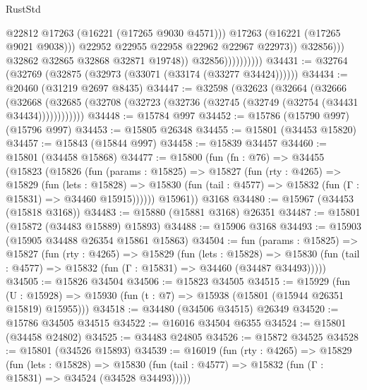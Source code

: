 \begin{lexlean}{RustStd}
\begin{coremodule}
                                          @22812
                                          @17263
                                          (@16221 (@17265 @9030 @4571)))
                                        @17263
                                        (@16221 (@17265 @9021 @9038)))
                                      @22952
                                      @22955
                                      @22958
                                      @22962
                                      @22967
                                      @22973))
                                  @32856)))
                            @32862
                            @32865
                            @32868
                            @32871
                            @19748))
                        @32856))))))))))
@34431 := @32764 (@32769 (@32875 (@32973 (@33071 (@33174 (@33277 @34424))))))
@34434 := @20460 (@31219 @2697 @8435)
@34447 := @32598
    (@32623
      (@32664
        (@32666
          (@32668 (@32685 (@32708 (@32723 (@32736 (@32745 (@32749 (@32754 (@34431 @34434))))))))))))
@34448 := @15784 @997
@34452 := @15786 (@15790 @997) (@15796 @997)
@34453 := @15805 @26348
@34455 := @15801 (@34453 @15820)
@34457 := @15843 (@15844 @997)
@34458 := @15839 @34457
@34460 := @15801 (@34458 @15868)
@34477 := @15800
    (fun (fn : @76) =>
    @34455
      (@15823
        (@15826
          (fun (params : @15825) =>
          @15827
            (fun (rty : @4265) =>
            @15829
              (fun (lets : @15828) =>
              @15830 (fun (tail : @4577) => @15832 (fun (Γ : @15831) => @34460 @15915))))))
        @15961))
    @3168
@34480 := @15967 (@34453 (@15818 @3168))
@34483 := @15880 (@15881 @3168) @26351
@34487 := @15801 (@15872 (@34483 @15889) @15893)
@34488 := @15906 @3168
@34493 := @15903 (@15905 @34488 @26354 @15861 @15863)
@34504 := fun (params : @15825) =>
  @15827
    (fun (rty : @4265) =>
    @15829
      (fun (lets : @15828) =>
      @15830 (fun (tail : @4577) => @15832 (fun (Γ : @15831) => @34460 (@34487 @34493)))))
@34505 := @15826 @34504
@34506 := @15823 @34505
@34515 := @15929
    (fun (U : @15928) => @15930 (fun (t : @7) => @15938 (@15801 (@15944 @26351 @15819) @15955)))
@34518 := @34480 (@34506 @34515) @26349
@34520 := @15786 @34505 @34515
@34522 := @16016 @34504 @6355
@34524 := @15801 (@34458 @24802)
@34525 := @34483 @24805
@34526 := @15872 @34525
@34528 := @15801 (@34526 @15893)
@34539 := @16019
    (fun (rty : @4265) =>
    @15829
      (fun (lets : @15828) =>
      @15830 (fun (tail : @4577) => @15832 (fun (Γ : @15831) => @34524 (@34528 @34493)))))

\end{coremodule}
\end{lexlean}
